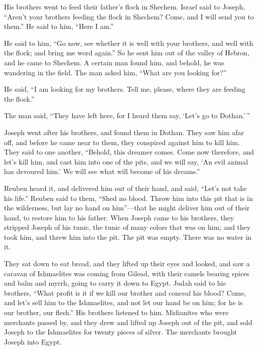  His brothers went to feed their father's flock in
Shechem.  Israel said to Joseph, ``Aren't your brothers
feeding the flock in Shechem? Come, and I will send you to them.'' He
said to him, ``Here I am.''

 He said to him, ``Go now, see whether it is well with
your brothers, and well with the flock; and bring me word again.'' So he
sent him out of the valley of Hebron, and he came to Shechem.
 A certain man found him, and behold, he was wandering in
the field. The man asked him, ``What are you looking for?''

 He said, ``I am looking for my brothers. Tell me,
please, where they are feeding the flock.''

 The man said, ``They have left here, for I heard them
say, `Let's go to Dothan.'\,''

Joseph went after his brothers, and found them in Dothan.
 They saw him afar off, and before he came near to them,
they conspired against him to kill him.  They said to one
another, ``Behold, this dreamer comes.  Come now
therefore, and let's kill him, and cast him into one of the pits, and we
will say, `An evil animal has devoured him.' We will see what will
become of his dreams.''

 Reuben heard it, and delivered him out of their hand,
and said, ``Let's not take his life.''  Reuben said to
them, ``Shed no blood. Throw him into this pit that is in the
wilderness, but lay no hand on him''---that he might deliver him out of
their hand, to restore him to his father.  When Joseph
came to his brothers, they stripped Joseph of his tunic, the tunic of
many colors that was on him;  and they took him, and
threw him into the pit. The pit was empty. There was no water in it.

 They sat down to eat bread, and they lifted up their
eyes and looked, and saw a caravan of Ishmaelites was coming from
Gilead, with their camels bearing spices and balm and myrrh, going to
carry it down to Egypt.  Judah said to his brothers,
``What profit is it if we kill our brother and conceal his blood?
 Come, and let's sell him to the Ishmaelites, and not let
our hand be on him; for he is our brother, our flesh.'' His brothers
listened to him.  Midianites who were merchants passed
by, and they drew and lifted up Joseph out of the pit, and sold Joseph
to the Ishmaelites for twenty pieces of silver. The merchants brought
Joseph into Egypt.


